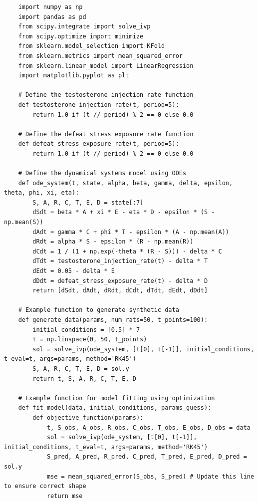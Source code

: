 \documentclass[english, a4paper, 11pt]{article}
\begin{document}
\begin{lstlisting}
    import numpy as np
    import pandas as pd
    from scipy.integrate import solve_ivp
    from scipy.optimize import minimize
    from sklearn.model_selection import KFold
    from sklearn.metrics import mean_squared_error
    from sklearn.linear_model import LinearRegression
    import matplotlib.pyplot as plt
    
    # Define the testosterone injection rate function
    def testosterone_injection_rate(t, period=5):
        return 1.0 if (t // period) % 2 == 0 else 0.0
    
    # Define the defeat stress exposure rate function
    def defeat_stress_exposure_rate(t, period=5):
        return 1.0 if (t // period) % 2 == 0 else 0.0
    
    # Define the dynamical systems model using ODEs
    def ode_system(t, state, alpha, beta, gamma, delta, epsilon, theta, phi, xi, eta):
        S, A, R, C, T, E, D = state[:7]
        dSdt = beta * A + xi * E - eta * D - epsilon * (S - np.mean(S))
        dAdt = gamma * C + phi * T - epsilon * (A - np.mean(A))
        dRdt = alpha * S - epsilon * (R - np.mean(R))
        dCdt = 1 / (1 + np.exp(-theta * (R - S))) - delta * C
        dTdt = testosterone_injection_rate(t) - delta * T
        dEdt = 0.05 - delta * E
        dDdt = defeat_stress_exposure_rate(t) - delta * D
        return [dSdt, dAdt, dRdt, dCdt, dTdt, dEdt, dDdt]
    
    # Example function to generate synthetic data
    def generate_data(params, num_rats=50, t_points=100):
        initial_conditions = [0.5] * 7
        t = np.linspace(0, 50, t_points)
        sol = solve_ivp(ode_system, [t[0], t[-1]], initial_conditions, t_eval=t, args=params, method='RK45')
        S, A, R, C, T, E, D = sol.y
        return t, S, A, R, C, T, E, D
    
    # Example function for model fitting using optimization
    def fit_model(data, initial_conditions, params_guess):
        def objective_function(params):
            t, S_obs, A_obs, R_obs, C_obs, T_obs, E_obs, D_obs = data
            sol = solve_ivp(ode_system, [t[0], t[-1]], initial_conditions, t_eval=t, args=params, method='RK45')
            S_pred, A_pred, R_pred, C_pred, T_pred, E_pred, D_pred = sol.y
            mse = mean_squared_error(S_obs, S_pred) # Update this line to ensure correct shape
            return mse
    

\end{lstlisting}
\end{document}
